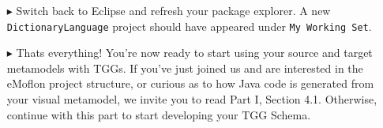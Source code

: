 \begin{itemize}
\item[$\blacktriangleright$] Switch back to Eclipse and refresh your package explorer. A new \texttt{DictionaryLanguage} project should have appeared under
\texttt{My Working Set}.

\item[$\blacktriangleright$] Thats everything! You're now ready to start using your source and target metamodels with TGGs. If you've just joined us and are
interested in the eMoflon project structure, or curious as to how Java code is generated from your visual metamodel, we invite you to read Part I, Section 4.1.
Otherwise, continue with this part to start developing your TGG Schema.


\end{itemize}
